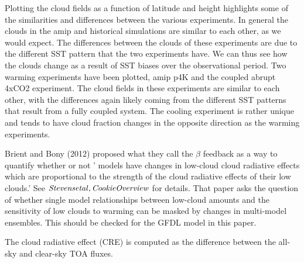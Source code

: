 \documentclass[11pt]{article}   	%
\begin{document}
Plotting the cloud fields as a function of latitude and height highlights some of the similarities and differences 
between the various experiments.  In general the clouds in the amip and historical simulations are similar to 
each other, as we would expect.  The differences between the clouds of these experiments are due to the 
different SST pattern that the two experiments have.  We can thus see how the clouds change as a result 
of SST biases over the observational period.  Two warming experiments have been plotted, amip p4K and 
the coupled abrupt 4xCO2 experiment.  The cloud fields in these experiments are similar to each other, with 
the differences again likely coming from the different SST patterns that result from a fully coupled system.  The 
cooling experiment is rather unique and tends to have cloud fraction changes in the opposite direction as 
the warming experiments.    

Brient and Bony (2012) proposed what they call the $\beta$ feedback as a way to quantify whether or not ' models have 
changes in low-cloud cloud radiative effects which are proportional to the strength of the cloud radiative effects of their
low clouds.'  See $\it{Stevens etal, Cookie Overview}$ for details.   That paper asks the question of whether single 
model relationships between low-cloud amounts and the sensitivity of low clouds to warming can be 
masked by changes in multi-model ensembles.  This should be checked for the GFDL model in this paper.  

The cloud radiative effect (CRE) is computed as the difference between the all-sky and clear-sky TOA fluxes.  
\end{document}
